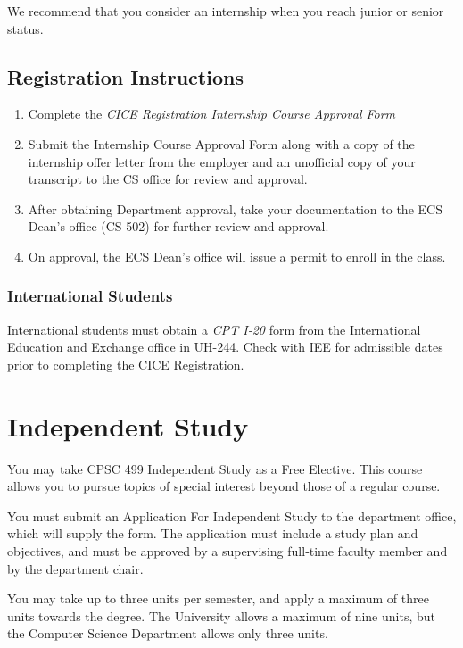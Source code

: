 \documentclass{book}
\begin{document}
We recommend that you consider an internship when you reach junior or senior status.

\subsection{Registration Instructions}

\begin{enumerate}
\item Complete the \emph{CICE Registration Internship Course Approval Form}
\item Submit the Internship Course Approval Form along with a copy of the internship offer
  letter from the employer and an unofficial copy of your transcript to the CS office  for review and approval.
\item After obtaining Department approval, take your documentation to the ECS Dean's office (CS-502) for further review and approval.
\item On approval, the ECS Dean’s office will issue a permit to enroll in the class.
\end{enumerate}

\subsubsection{International Students}

International students must obtain a \emph{CPT I-20} form from the International Education and Exchange office in UH-244. Check with IEE for admissible dates prior to completing the CICE Registration.

\section{Independent Study}

You may take CPSC 499 Independent Study as a Free Elective. This course allows you to pursue topics of special interest beyond those of a regular course.

You must submit an Application For Independent Study to the department office, which will supply the form. The application must include a study plan and objectives, and must be approved by a supervising full‑time faculty member and by the department chair.

You may take up to three units per semester, and apply a maximum of three units towards the degree. The University allows a maximum of nine units, but the Computer Science Department allows only three units.
\end{document}
